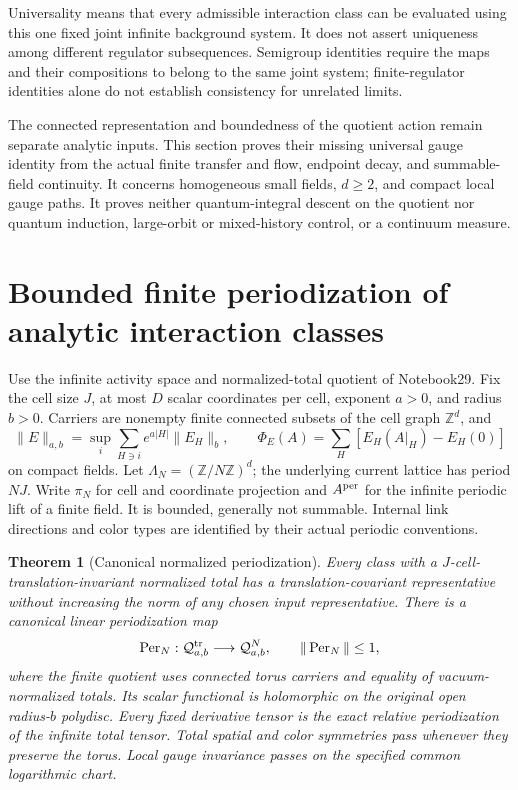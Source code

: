 \documentclass[11pt]{article}
\newtheorem{theorem}{Theorem}[section]
\theoremstyle{remark}
\begin{document}
Universality means that every admissible interaction class can be
evaluated using this one fixed joint infinite background system.
It does not assert uniqueness among different regulator subsequences.
Semigroup identities require the maps and their compositions to
belong to the same joint system; finite-regulator identities alone
do not establish consistency for unrelated limits.

The connected representation and boundedness of the quotient action
remain separate analytic inputs. This section proves their missing
universal gauge identity from the actual finite transfer and flow,
endpoint decay, and summable-field continuity. It concerns homogeneous
small fields, $d\ge2$, and compact local gauge paths. It proves neither
quantum-integral descent on the quotient nor quantum induction,
large-orbit or mixed-history control, or a continuum measure.


\section{Bounded finite periodization of analytic interaction classes}
\label{pid-section}

Use the infinite activity space and normalized-total quotient of
Notebook29. Fix the cell size $J$, at most $D$ scalar coordinates
per cell, exponent $a>0$, and radius $b>0$. Carriers are nonempty
finite connected subsets of the cell graph $\mathbb Z^d$, and
\begin{equation}
 \|E\|_{a,b}=\sup_i\sum_{H\ni i}e^{a|H|}\|E_H\|_b,
 \qquad
 \Phi_E(A)=\sum_H[E_H(A|_H)-E_H(0)]
 \label{pid-space}
\end{equation}
on compact fields. Let $\Lambda_N=(\mathbb Z/N\mathbb Z)^d$;
the underlying current lattice has period $NJ$. Write $\pi_N$
for cell and coordinate projection and $A^{\rm per}$ for the
infinite periodic lift of a finite field. It is bounded, generally
not summable. Internal link directions and color types are
identified by their actual periodic conventions.

\begin{theorem}[Canonical normalized periodization]
\label{pid-theorem}
Every class with a $J$-cell-translation-invariant normalized total
has a translation-covariant representative without increasing the
norm of any chosen input representative. There is a canonical
linear periodization map
\begin{equation}
 \operatorname{Per}_N:\mathcal Q^{\rm tr}_{a,b}
                   \longrightarrow\mathcal Q^N_{a,b},
 \qquad \|\operatorname{Per}_N\|\le1,
 \label{pid-operator}
\end{equation}
where the finite quotient uses connected torus carriers and
equality of vacuum-normalized totals. Its scalar functional is
holomorphic on the original open radius-$b$ polydisc. Every
fixed derivative tensor is the exact relative periodization of
the infinite total tensor. Total spatial and color symmetries
pass whenever they preserve the torus. Local gauge invariance
passes on the specified common logarithmic chart.
\end{theorem}
\end{document}
